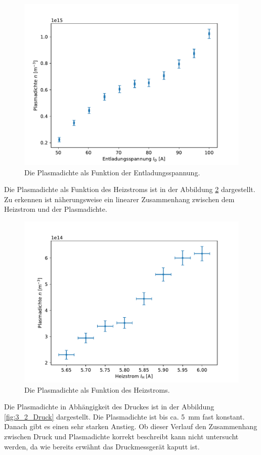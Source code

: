 \begin{figure}[H]
\centering
\includegraphics[scale=0.6]{3_2_Spannung.pdf}
\caption{Die Plasmadichte  als Funktion der Entladungsspannung.}
\label{fig:3_2_Spannung}
\end{figure}
Die Plasmadichte als Funktion des Heizstroms ist in der Abbildung \ref{fig:3_2_Strom} dargestellt. Zu erkennen ist  näherungsweise ein linearer Zusammenhang zwischen dem Heizstrom und der Plasmadichte.  
\begin{figure}[H]
\centering
\includegraphics[scale=0.6]{3_2_Strom.pdf}
\caption{Die Plasmadichte als Funktion des Heizstroms.}
\label{fig:3_2_Strom}
\end{figure}
Die Plasmadichte in Abhängigkeit des Druckes ist in der Abbildung \ref{fig:3_2_Druck} dargestellt. Die Plasmadichte ist bis ca. \SI{5}{mm} fast konstant. Danach gibt es einen sehr starken Anstieg. Ob dieser Verlauf den Zusammenhang zwischen Druck und Plasmadichte korrekt beschreibt kann nicht untersucht werden, da wie bereits erwähnt das Druckmessgerät kaputt ist. 
